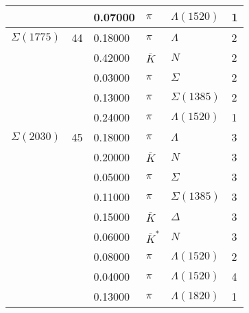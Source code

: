 \documentclass[a4paper,10pt]{article}
\begin{document}
\begin{tabular}[t]{lrllll}
$                    $&   & 0.07000&$ \pi                 $ &$ \Lambda(1520)       $& 1\\
\midrule
$      \Sigma(1775)  $& 44& 0.18000&$ \pi                 $ &$ \Lambda             $& 2\\
$                    $&   & 0.42000&$ \overline{K}        $ &$ N                   $& 2\\
$                    $&   & 0.03000&$ \pi                 $ &$ \Sigma              $& 2\\
$                    $&   & 0.13000&$ \pi                 $ &$ \Sigma(1385)        $& 2\\
$                    $&   & 0.24000&$ \pi                 $ &$ \Lambda(1520)       $& 1\\
\midrule
$      \Sigma(2030)  $& 45& 0.18000&$ \pi                 $ &$ \Lambda             $& 3\\
$                    $&   & 0.20000&$ \overline{K}        $ &$ N                   $& 3\\
$                    $&   & 0.05000&$ \pi                 $ &$ \Sigma              $& 3\\
$                    $&   & 0.11000&$ \pi                 $ &$ \Sigma(1385)        $& 3\\
$                    $&   & 0.15000&$ \overline{K}        $ &$ \Delta              $& 3\\
$                    $&   & 0.06000&$ \overline{K}^*      $ &$ N                   $& 3\\
$                    $&   & 0.08000&$ \pi                 $ &$ \Lambda(1520)       $& 2\\
$                    $&   & 0.04000&$ \pi                 $ &$ \Lambda(1520)       $& 4\\
$                    $&   & 0.13000&$ \pi                 $ &$ \Lambda(1820)       $& 1\\
\bottomrule
\end{tabular}
\hspace*{1cm}
\end{document}
